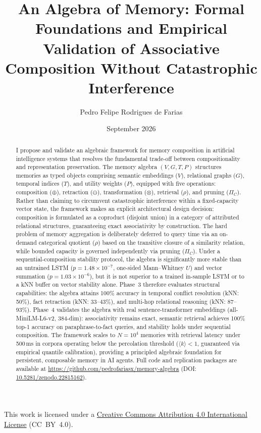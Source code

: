 \documentclass[11pt,a4paper]{article}
\title{\textbf{An Algebra of Memory: Formal Foundations and Empirical Validation of Associative Composition Without Catastrophic Interference}}
\author[1]{Pedro Felipe Rodrigues de Farias}
\affil[1]{Independent Researcher}
\date{September 2026}
\theoremstyle{definition}
\begin{document}
\maketitle

\vspace{-1.5em}
\begin{center}
\small
This work is licensed under a \href{https://creativecommons.org/licenses/by/4.0/}{Creative Commons Attribution 4.0 International License} (CC~BY~4.0).
\end{center}
\vspace{0.5em}

\begin{abstract}
I propose and validate an algebraic framework for memory composition in artificial intelligence systems that resolves the fundamental trade-off between compositionality and representation preservation. The memory algebra $(V, G, T, P)$ structures memories as typed objects comprising semantic embeddings ($V$), relational graphs ($G$), temporal indices ($T$), and utility weights ($P$), equipped with five operations: composition ($\oplus$), retraction ($\ominus$), transformation ($\otimes$), retrieval ($\rho$), and pruning ($\Pi_C$). Rather than claiming to circumvent catastrophic interference within a fixed-capacity vector state, the framework makes an explicit architectural design decision: composition is formulated as a coproduct (disjoint union) in a category of attributed relational structures, guaranteeing exact associativity by construction. The hard problem of memory aggregation is deliberately deferred to query time via an on-demand categorical quotient ($\rho$) based on the transitive closure of a similarity relation, while bounded capacity is governed independently via pruning ($\Pi_C$). Under a sequential-composition stability protocol, the algebra is significantly more stable than an untrained LSTM ($p = 1.48 \times 10^{-7}$, one-sided Mann--Whitney $U$) and vector summation ($p = 1.03 \times 10^{-6}$), but it is not superior to a trained in-sample LSTM or to a kNN buffer on vector stability alone. Phase~3 therefore evaluates structural capabilities: the algebra attains 100\% accuracy in temporal conflict resolution (kNN: 50\%), fact retraction (kNN: 33--43\%), and multi-hop relational reasoning (kNN: 87--93\%). Phase~4 validates the algebra with real sentence-transformer embeddings (all-MiniLM-L6-v2, 384-dim): associativity remains exact, semantic retrieval achieves 100\% top-1 accuracy on paraphrase-to-fact queries, and stability holds under sequential composition. The framework scales to $N = 10^4$ memories with retrieval latency under 500\,ms in corpora operating below the percolation threshold ($\langle k \rangle < 1$, guaranteed via empirical quantile calibration), providing a principled algebraic foundation for persistent, composable memory in AI agents. Full code and replication packages are available at \url{https://github.com/pedrofariasx/memory-algebra} (DOI: \href{https://doi.org/10.5281/zenodo.22815162}{10.5281/zenodo.22815162}).
\end{abstract}
\end{document}
